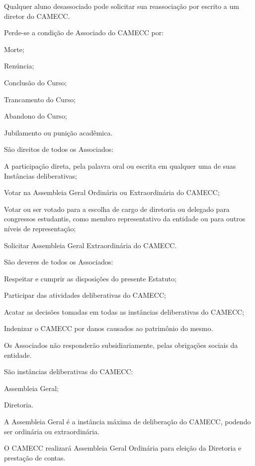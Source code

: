 \documentclass{estatuto}
\begin{document}
\inciso Qualquer aluno desassociado pode solicitar sua reassociação por escrito a um diretor do CAMECC.

\artigo Perde-se a condição de Associado do CAMECC por:

\inciso Morte;

\inciso Renúncia;

\inciso Conclusão do Curso;

\inciso Trancamento do Curso;

\inciso Abandono do Curso;

\inciso Jubilamento ou punição acadêmica.

\artigo São direitos de todos os Associados:

\inciso A participação direta, pela palavra oral ou escrita em qualquer uma de suas Instâncias deliberativas;

\inciso Votar na Assembleia Geral Ordinária ou Extraordinária do CAMECC;

\inciso Votar ou ser votado para a escolha de cargo de diretoria ou delegado para congressos estudantis,
como membro representativo da entidade ou para outros níveis de representação;

\inciso Solicitar Assembleia Geral Extraordinária do CAMECC.

\artigo São deveres de todos os Associados:

\inciso Respeitar e cumprir as disposições do presente Estatuto;

\inciso Participar das atividades deliberativas do CAMECC;

\inciso Acatar as decisões tomadas em todas as instâncias deliberativas do CAMECC;

\inciso Indenizar o CAMECC por danos causados ao patrimônio do mesmo.

\artigo Os Associados não responderão subsidiariamente, pelas obrigações sociais da entidade.


\artigo São instâncias deliberativas do CAMECC:

\inciso Assembleia Geral;

\inciso Diretoria.


\artigo A Assembleia Geral é a instância máxima de deliberação do CAMECC, podendo ser ordinária ou extraordinária.

\artigo O CAMECC realizará Assembleia Geral Ordinária para eleição da Diretoria e prestação de contas.
\end{document}
